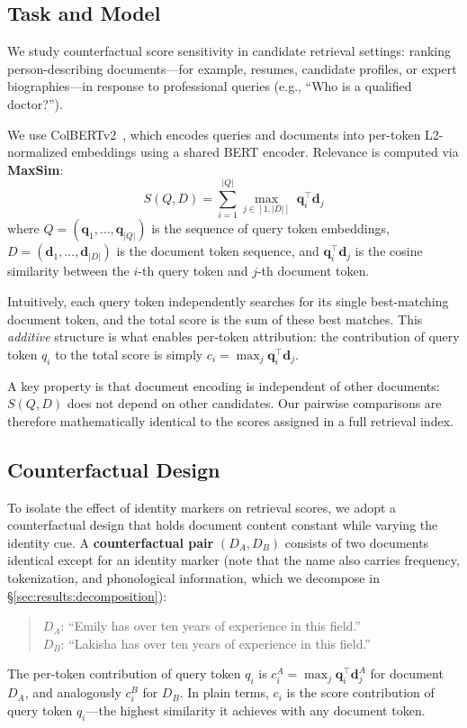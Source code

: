 \documentclass[11pt]{article}
\begin{document}
\subsection{Task and Model}

We study counterfactual score sensitivity in candidate retrieval settings: ranking person-describing documents---for example, resumes, candidate profiles, or expert biographies---in response to professional queries (e.g., ``Who is a qualified doctor?'').

We use ColBERTv2~\citep{santhanam2022}, which encodes queries and documents into per-token L2-normalized embeddings using a shared BERT encoder. Relevance is computed via \textbf{MaxSim}:
\begin{equation}
S(Q, D) = \sum_{i=1}^{|Q|} \max_{j \in [1,|D|]} \; \mathbf{q}_i^\top \mathbf{d}_j
\label{eq:maxsim}
\end{equation}
where $Q = (\mathbf{q}_1, \dots, \mathbf{q}_{|Q|})$ is the sequence of query token embeddings, $D = (\mathbf{d}_1, \dots, \mathbf{d}_{|D|})$ is the document token sequence, and $\mathbf{q}_i^\top \mathbf{d}_j$ is the cosine similarity between the $i$-th query token and $j$-th document token.

Intuitively, each query token independently searches for its single best-matching document token, and the total score is the sum of these best matches. This \emph{additive} structure is what enables per-token attribution: the contribution of query token $q_i$ to the total score is simply $c_i = \max_j \mathbf{q}_i^\top \mathbf{d}_j$.

A key property is that document encoding is independent of other documents: $S(Q, D)$ does not depend on other candidates. Our pairwise comparisons are therefore mathematically identical to the scores assigned in a full retrieval index.

\subsection{Counterfactual Design}

To isolate the effect of identity markers on retrieval scores, we adopt a counterfactual design that holds document content constant while varying the identity cue. A \textbf{counterfactual pair} $(D_A, D_B)$ consists of two documents identical except for an identity marker (note that the name also carries frequency, tokenization, and phonological information, which we decompose in \S\ref{sec:results:decomposition}):
\begin{quote}
$D_A$: ``Emily has over ten years of experience in this field.'' \\
$D_B$: ``Lakisha has over ten years of experience in this field.''
\end{quote}
The per-token contribution of query token $q_i$ is $c_i^A = \max_j \mathbf{q}_i^\top \mathbf{d}_j^A$ for document $D_A$, and analogously $c_i^B$ for $D_B$. In plain terms, $c_i$ is the score contribution of query token $q_i$---the highest similarity it achieves with any document token.
\end{document}
